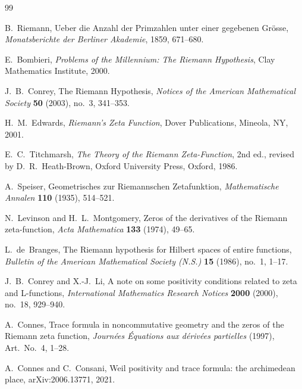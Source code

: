 \documentclass[11pt,a4paper]{amsart}
\theoremstyle{plain}
\theoremstyle{definition}
\begin{document}
\begin{thebibliography}{99}

B.~Riemann,
\newblock Ueber die Anzahl der Primzahlen unter einer gegebenen Gr\"osse,
\newblock \emph{Monatsberichte der Berliner Akademie}, 1859, 671--680.

E.~Bombieri,
\newblock \emph{Problems of the Millennium: The Riemann Hypothesis},
\newblock Clay Mathematics Institute, 2000.

J.~B.~Conrey,
\newblock The Riemann Hypothesis,
\newblock \emph{Notices of the American Mathematical Society} \textbf{50} (2003), no.~3, 341--353.

H.~M.~Edwards,
\newblock \emph{Riemann's Zeta Function},
\newblock Dover Publications, Mineola, NY, 2001.

E.~C.~Titchmarsh,
\newblock \emph{The Theory of the Riemann Zeta-Function},
\newblock 2nd ed., revised by D.~R.~Heath-Brown,
\newblock Oxford University Press, Oxford, 1986.

A.~Speiser,
\newblock Geometrisches zur Riemannschen Zetafunktion,
\newblock \emph{Mathematische Annalen} \textbf{110} (1935), 514--521.

N.~Levinson and H.~L.~Montgomery,
\newblock Zeros of the derivatives of the Riemann zeta-function,
\newblock \emph{Acta Mathematica} \textbf{133} (1974), 49--65.

L.~de~Branges,
\newblock The Riemann hypothesis for Hilbert spaces of entire functions,
\newblock \emph{Bulletin of the American Mathematical Society (N.S.)}
\textbf{15} (1986), no.~1, 1--17.

J.~B.~Conrey and X.-J.~Li,
\newblock A note on some positivity conditions related to zeta and L-functions,
\newblock \emph{International Mathematics Research Notices} \textbf{2000}
(2000), no.~18, 929--940.

A.~Connes,
\newblock Trace formula in noncommutative geometry and the zeros of the Riemann zeta function,
\newblock \emph{Journ\'ees \'Equations aux d\'eriv\'ees partielles} (1997), Art.~No.~4, 1--28.

A.~Connes and C.~Consani,
\newblock Weil positivity and trace formula: the archimedean place,
\newblock arXiv:2006.13771, 2021.

\end{thebibliography}
\end{document}
